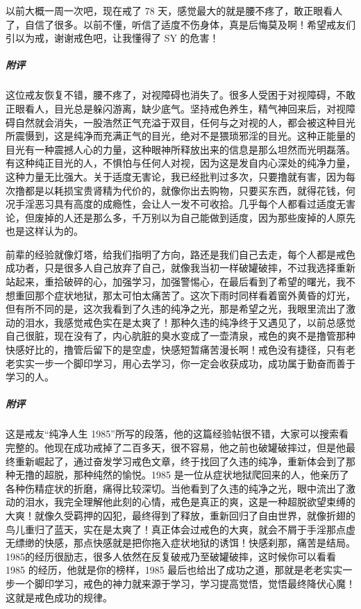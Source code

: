 \begin{case}
    以前大概一周一次吧，现在戒了 78 天，感觉最大的就是腰不疼了，敢正眼看人了，自信了很多。以前不懂，听信了适度不伤身体，真是后悔莫及啊！希望戒友们引以为戒，谢谢戒色吧，让我懂得了 SY 的危害！
    \subparagraph{附评} 这位戒友恢复不错，腰不疼了，对视障碍也消失了。很多人受困于对视障碍，不敢正眼看人，目光总是躲闪游离，缺少底气。坚持戒色养生，精气神回来后，对视障碍自然就会消失，一股浩然正气充溢于双目，任何与之对视的人，都会被这种目光所震慑到，这是纯净而充满正气的目光，绝对不是猥琐邪淫的目光。这种正能量的目光有一种震撼人心的力量，这种眼神所释放出来的信息是那么坦然而光明磊落。有这种纯正目光的人，不惧怕与任何人对视，因为这是发自内心深处的纯净力量，这种力量无比强大。关于适度无害论，我已经批判过多次，只要撸就有害，因为每次撸都是以耗损宝贵肾精为代价的，就像你出去购物，只要买东西，就得花钱，何况手淫恶习具有高度的成瘾性，会让人一发不可收拾。几乎每个人都看过适度无害论，但废掉的人还是那么多，千万别以为自己能做到适度，因为那些废掉的人原先也是这样认为的。
\end{case}

\begin{case}
    前辈的经验就像灯塔，给我们指明了方向，路还是我们自己去走，每个人都是戒色成功者，只是很多人自己放弃了自己，就像我当初一样破罐破摔，不过我选择重新站起来，重拾破碎的心，加强学习，加强警惕心，在最后看到了希望的曙光，我不想重回那个症状地狱，那太可怕太痛苦了。这次下雨时同样看着窗外黄昏的灯光，但有所不同的是，这次我看到了久违的纯净之光，那是希望之光，我眼里流出了激动的泪水，我感觉戒色实在是太爽了！那种久违的纯净终于又遇见了，以前总感觉自己很脏，现在没有了，内心肮脏的臭水变成了一壶清泉，戒色的爽不是撸管那种快感好比的，撸管后留下的是空虚，快感短暂痛苦漫长啊！戒色没有捷径，只有老老实实一步一个脚印学习，用心去学习，你一定会收获成功，成功属于勤奋而善于学习的人。
    \subparagraph{附评} 这是戒友“纯净人生 1985”所写的段落，他的这篇经验帖很不错，大家可以搜索看完整的。他现在成功戒掉了二百多天，很不容易，他之前也破罐破摔过，但是他最终重新崛起了，通过奋发学习戒色文章，终于找回了久违的纯净，重新体会到了那种无撸的超脱，那种纯然的愉悦。1985 是一位从症状地狱爬回来的人，他亲历了各种伤精症状的折磨，痛得比较深切。当他看到了久违的纯净之光，眼中流出了激动的泪水，我完全理解他此刻的心情，戒色是真正的爽，这是一种超脱欲望束缚的大爽！就像久受羁押的囚犯，最终得到了释放，重新回归了自由世界，就像折翅的鸟儿重归了蓝天，实在是太爽了！真正体会过戒色的大爽，就会不屑于手淫那点虚无缥缈的快感，那点快感就是把你拖入症状地狱的诱饵！快感刹那，痛苦是结局。1985的经历很励志，很多人依然在反复破戒乃至破罐破摔，这时候你可以看看 1985 的经历，他就是你的榜样，1985 最后也给出了成功之道，那就是老老实实一步一个脚印学习，戒色的神力就来源于学习，学习提高觉悟，觉悟最终降伏心魔！这就是戒色成功的规律。
\end{case}


